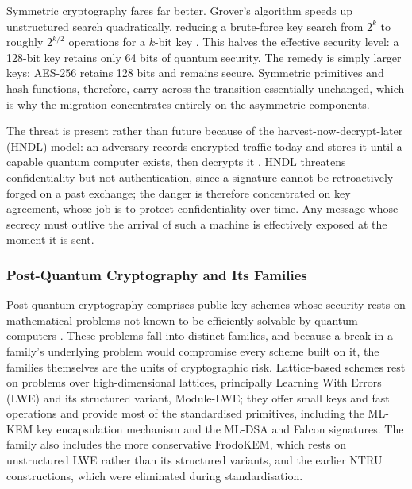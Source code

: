 Symmetric cryptography fares far better. Grover's algorithm speeds up unstructured search quadratically, reducing a brute-force key search from $2^{k}$ to roughly $2^{k/2}$ operations for a $k$-bit key \cite{grover_fast_1996}. This halves the effective security level: a 128-bit key retains only 64 bits of quantum security. The remedy is simply larger keys; AES-256 retains 128 bits and remains secure. Symmetric primitives and hash functions, therefore, carry across the transition essentially unchanged, which is why the migration concentrates entirely on the asymmetric components.

The threat is present rather than future because of the harvest-now-decrypt-later (HNDL) model: an adversary records encrypted traffic today and stores it until a capable quantum computer exists, then decrypts it \cite{mosca_cybersecurity_2018}. HNDL threatens confidentiality but not authentication, since a signature cannot be retroactively forged on a past exchange; the danger is therefore concentrated on key agreement, whose job is to protect confidentiality over time. Any message whose secrecy must outlive the arrival of such a machine is effectively exposed at the moment it is sent.

\subsubsection{Post-Quantum Cryptography and Its Families}
\label{subsubsec:pqc-families}

Post-quantum cryptography comprises public-key schemes whose security rests on mathematical problems not known to be efficiently solvable by quantum computers \cite{bernstein_post-quantum_2017}. These problems fall into distinct families, and because a break in a family's underlying problem would compromise every scheme built on it, the families themselves are the units of cryptographic risk. Lattice-based schemes rest on problems over high-dimensional lattices, principally Learning With Errors (LWE) and its structured variant, Module-LWE; they offer small keys and fast operations and provide most of the standardised primitives, including the ML-KEM key encapsulation mechanism and the ML-DSA and Falcon signatures. The family also includes the more conservative FrodoKEM, which rests on unstructured LWE rather than its structured variants, and the earlier NTRU constructions, which were eliminated during standardisation. 


